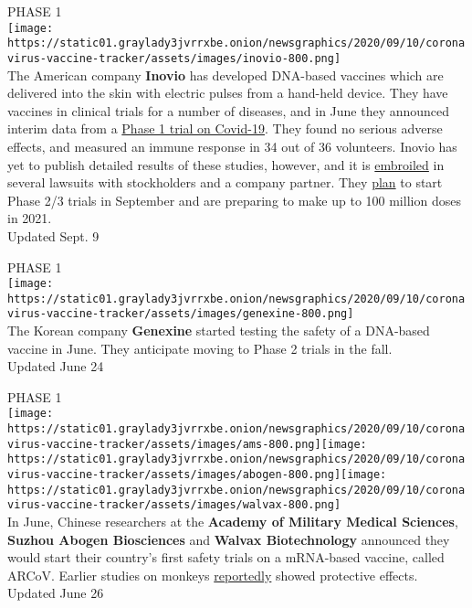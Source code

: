 PHASE 1\\
\texttt{[image: https://static01.graylady3jvrrxbe.onion/newsgraphics/2020/09/10/coronavirus-vaccine-tracker/assets/images/inovio-800.png]}\\
The American company \textbf{\textbf{Inovio}} has developed DNA-based
vaccines which are delivered into the skin with electric pulses from a
hand-held device. They have vaccines in clinical trials for a number of
diseases, and in June they announced interim data from a
\href{https://www.nytimes3xbfgragh.onion/2020/06/13/science/vaccine-coronavirus-inovio.html}{Phase
1 trial on Covid-19}. They found no serious adverse effects, and
measured an immune response in 34 out of 36 volunteers. Inovio has yet
to publish detailed results of these studies, however, and it is
\href{https://www.nytimes3xbfgragh.onion/2020/08/09/business/coronavirus-vaccine-inovio.html}{embroiled}
in several lawsuits with stockholders and a company partner. They
\href{http://ir.inovio.com/news-releases/news-releases-details/2020/INOVIO-Adds-Thermo-Fisher-Scientific-To-Global-Manufacturing-Consortium/default.aspx}{plan}
to start Phase 2/3 trials in September and are preparing to make up to
100 million doses in 2021.\\
Updated Sept. 9

PHASE 1\\
\texttt{[image: https://static01.graylady3jvrrxbe.onion/newsgraphics/2020/09/10/coronavirus-vaccine-tracker/assets/images/genexine-800.png]}\\
The Korean company \textbf{\textbf{Genexine}} started testing the safety
of a DNA-based vaccine in June. They anticipate moving to Phase 2 trials
in the fall.\\
Updated June 24

PHASE 1\\
\texttt{[image: https://static01.graylady3jvrrxbe.onion/newsgraphics/2020/09/10/coronavirus-vaccine-tracker/assets/images/ams-800.png]}\texttt{[image: https://static01.graylady3jvrrxbe.onion/newsgraphics/2020/09/10/coronavirus-vaccine-tracker/assets/images/abogen-800.png]}\texttt{[image: https://static01.graylady3jvrrxbe.onion/newsgraphics/2020/09/10/coronavirus-vaccine-tracker/assets/images/walvax-800.png]}\\
In June, Chinese researchers at the \textbf{\textbf{Academy of Military
Medical Sciences}}, \textbf{\textbf{Suzhou Abogen Biosciences}} and
\textbf{\textbf{Walvax Biotechnology}} announced they would start their
country's first safety trials on a mRNA-based vaccine, called ARCoV.
Earlier studies on monkeys
\href{https://news.cgtn.com/news/2020-06-26/China-s-first-COVID-19-mRNA-vaccine-approved-for-clinical-trials-RDTXX0jVJK/index.html}{reportedly}
showed protective effects.\\
Updated June 26

